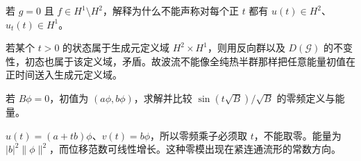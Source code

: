 \begin{exercise}[波流没有热流平滑性]\label{ex:y14-no-wave-smoothing}
若 $g=0$ 且 $f\in H^1\setminus H^2$，解释为什么不能声称对每个正 $t$ 都有 $u(t)\in H^2$、$u_t(t)\in H^1$。
\end{exercise}
\begin{solution}
若某个 $t>0$ 的状态属于生成元定义域 $H^2\times H^1$，则用反向群以及 $D(\mathcal G)$ 的不变性，初态也属于该定义域，矛盾。故波流不能像全纯热半群那样把任意能量初值在正时间送入生成元定义域。
\end{solution}

\begin{exercise}[零频的正确取值]\label{ex:y14-wave-zero}
若 $B\phi=0$，初值为 $(a\phi,b\phi)$，求解并比较 $\sin(t\sqrt B)/\sqrt B$ 的零频定义与能量。
\end{exercise}
\begin{solution}
$u(t)=(a+tb)\phi$、$v(t)=b\phi$，所以零频乘子必须取 $t$，不能取零。能量为 $|b|^2\|\phi\|^2$，而位移范数可线性增长。这种零模出现在紧连通流形的常数方向。
\end{solution}
